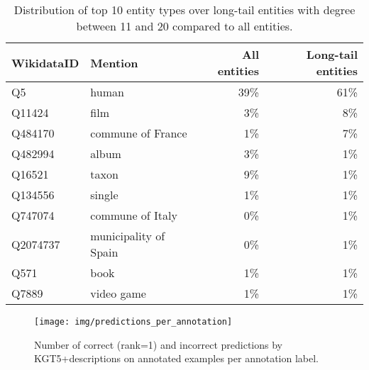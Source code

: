 \documentclass[11pt]{article}
\renewcommand\:{\colon} \newcommand{\sset}[1]{\left\{\,#1\,\right\}} \newcommand{\ssets}[1]{\left\{#1\right\}} \newcommand{\ssetn}[1]{\{\,#1\,\}}
\begin{document}
\begin{table*}
  \centering
  \begin{tabular}{llrr}
    \toprule
    \textbf{WikidataID} & \textbf{Mention} & \textbf{All entities} & \textbf{Long-tail entities} \\
    \midrule
    Q5 & human & 39\% & 61\% \\
    Q11424 & film & 3\% & 8\% \\
    Q484170 & commune of France & 1\% & 7\% \\
    Q482994 & album & 3\% & 1\% \\
    Q16521 & taxon & 9\% & 1\% \\
    Q134556 & single & 1\% & 1\% \\
    Q747074 & commune of Italy & 0\% & 1\% \\
    Q2074737 & municipality of Spain & 0\% & 1\% \\
    Q571 & book & 1\% & 1\% \\
    Q7889 & video game & 1\% & 1\% \\
    \bottomrule
  \end{tabular}
  \caption{Distribution of top 10 entity types over long-tail entities with degree between 11 and 20 compared to all entities.}
  \label{tab:entity_type_distribution}
\end{table*}





\begin{figure*}
  \centering
  \texttt{[image: img/predictions\_per\_annotation]}
\caption{
  Number of correct (rank=1) and incorrect predictions by KGT5+descriptions on annotated examples per annotation label.
}
\label{fig:prediction_per_annotation}
\end{figure*}
\end{document}
